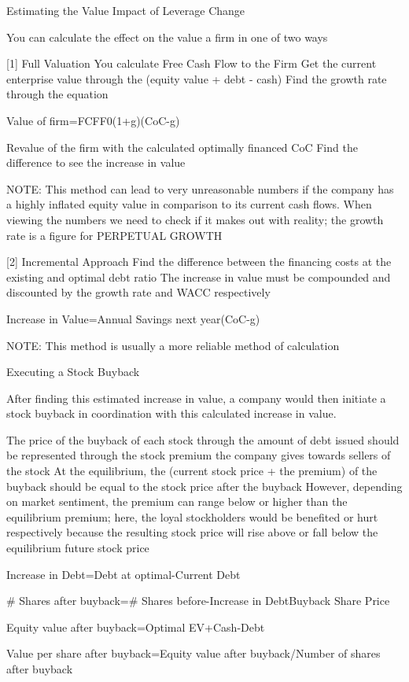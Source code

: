 \documentclass[10pt]{article}
\begin{document}
    \begin{core}{Estimating the Value Impact of Leverage Change}

      You can calculate the effect on the value a firm in one of two ways

      [1] Full Valuation
      You calculate Free Cash Flow to the Firm
      Get the current enterprise value through the (equity value + debt - cash)
      Find the growth rate through the equation

      Value of firm=FCFF0(1+g)(CoC-g)

      Revalue of the firm with the calculated optimally financed CoC
      Find the difference to see the increase in value

      NOTE: This method can lead to very unreasonable numbers if the company has a highly inflated equity value in comparison to its current cash flows.
      When viewing the numbers we need to check if it makes out with reality; the growth rate is a figure for PERPETUAL GROWTH

      [2] Incremental Approach
      Find the difference between the financing costs at the existing and optimal debt ratio
      The increase in value must be compounded and discounted by the growth rate and WACC respectively

      Increase in Value=Annual Savings next year(CoC-g)

      NOTE: This method is usually a more reliable method of calculation

    \end{core}

    \begin{core}{Executing a Stock Buyback}

      After finding this estimated increase in value, a company would then initiate a stock buyback in coordination with this calculated increase in value. 

      The price of the buyback of each stock through the amount of debt issued should be represented through the stock premium the company gives towards sellers of the stock 
      At the equilibrium, the (current stock price + the premium) of the buyback should be equal to the stock price after the buyback
      However, depending on market sentiment, the premium can range below or higher than the equilibrium premium; here, the loyal stockholders would be benefited or hurt respectively because the resulting stock price will rise above or fall below the equilibrium future stock price

      Increase in Debt=Debt at optimal-Current Debt

      # Shares after buyback=# Shares before-Increase in DebtBuyback Share Price

      Equity value after buyback=Optimal EV+Cash-Debt

      Value per share after buyback=Equity value after buyback/Number of shares after buyback

    \end{core}
\end{document}
